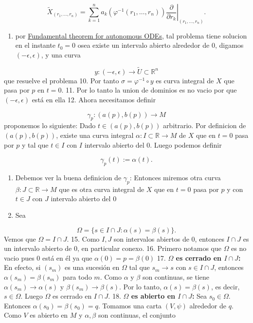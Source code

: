 \begin{bookproof}{}
\[
\widetilde X_{(r_1,\ldots,r_n)}=\sum_{k=1}^n a_k(\varphi^{-1}(r_1,\ldots,r_n))\left.\frac{\partial}{\partial r_k}\right|_{(r_1,\ldots,r_n)}.
\]
\begin{enumerate}[start=9]
\item por \hyperref[blk:81ef7e]{Fundamental theorem for autonomous ODEs}, tal problema tiene solucion en el instante $t_0=0$ osea existe un intervalo abierto alrededor de $0$, digamos $(-\epsilon,\epsilon)$, y una curva
\end{enumerate}
\[
y:(-\epsilon,\epsilon)\to \widetilde{U}\subset\mathbb R^n
\]
que resuelve el problema 10. Por tanto $\sigma=\varphi^{-1}\circ y$ es curva integral de $X$ que pasa por $p$ en $t=0$. 11. Por lo tanto la union de dominios es no vacio por que $(-\epsilon,\epsilon)$ está en ella 12. Ahora necesitamos definir

\[
\gamma_p:(a(p),b(p))\to M
\]
proponemos lo siguiente: Dado $t\in(a(p),b(p))$ arbitrario. Por definicion de $(a(p),b(p))$, existe una curva integral $\alpha:I\subset\mathbb R\to M$ de $X$ que en $t=0$ pasa por $p$ y tal que $t\in I$ con $I$ intervalo abierto del $0$. Luego podemos definir

\[
\gamma_p(t):=\alpha(t).
\]
\begin{enumerate}[start=13]
\item Debemos ver la buena definicion de $\gamma_p$: Entonces miremos otra curva $\beta:J\subset\mathbb R\to M$ que es otra curva integral de $X$ que en $t=0$ pasa por $p$ y con $t\in J$ con $J$ intervalo abierto del $0$
\item Sea
\end{enumerate}
\[
\Omega=\{s\in I\cap J:\alpha(s)=\beta(s)\}.
\]
Vemos que $\Omega=I\cap J$. 15. Como $I,J$ son intervalos abiertos de $0$, entonces $I\cap J$ es un intervalo abierto de $0$, en particular conexo. 16. Primero notamos que $\Omega$ es no vacio pues $0$ está en él ya que $\alpha (0)=p=\beta(0)$ 17. \textbf{$\Omega$ es cerrado en $I\cap J$:} En efecto, si $(s_m)$ es una sucesión en $\Omega$ tal que $s_m\to s$ con $s\in I\cap J$, entonces $\alpha(s_m)=\beta(s_m)$ para todo $m$. Como $\alpha$ y $\beta$ son continuas, se tiene $\alpha(s_m)\to\alpha(s)$ y $\beta(s_m)\to\beta(s)$. Por lo tanto, $\alpha(s)=\beta(s)$, es decir, $s\in\Omega$. Luego $\Omega$ es cerrado en $I\cap J$. 18. \textbf{$\Omega$ es abierto en $I\cap J$:} Sea $s_0\in\Omega$. Entonces $\alpha(s_0)=\beta(s_0)=q$. Tomamos una carta $(V,\psi)$ alrededor de $q$. Como $V$ es abierto en $M$ y $\alpha,\beta$ son continuas, el conjunto


\end{bookproof}
